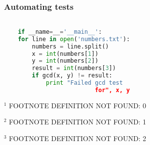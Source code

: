 \documentclass[presentation]{beamer}
\begin{document}
\begin{frame}[fragile]
\frametitle{Automating tests}
\label{sec-4}

\begin{lstlisting}[language=python]

    if __name=__='__main__':
    for line in open('numbers.txt'):
        numbers = line.split()
        x = int(numbers[1])
        y = int(numbers[2])
        result = int(numbers[3])
        if gcd(x, y) != result:
            print "Failed gcd test
                          for", x, y
\end{lstlisting}




$^{1}$ FOOTNOTE DEFINITION NOT FOUND: 0

$^{2}$ FOOTNOTE DEFINITION NOT FOUND: 1

$^{3}$ FOOTNOTE DEFINITION NOT FOUND: 2
\end{frame}
\end{document}
